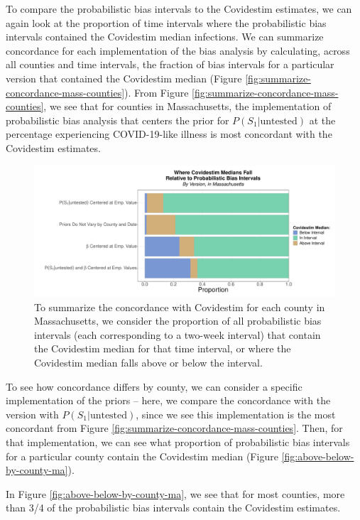 \documentclass[12pt,twoside]{smiththesis}
\begin{document}
To compare the probabilistic bias intervals to the Covidestim estimates, we can again look at the proportion of time intervals where the probabilistic bias intervals contained the Covidestim median infections. We can summarize concordance for each implementation of the bias analysis by calculating, across all counties and time intervals, the fraction of bias intervals for a particular version that contained the Covidestim median (Figure \ref{fig:summarize-concordance-mass-counties}). From Figure \ref{fig:summarize-concordance-mass-counties}, we see that for counties in Massachusetts, the implementation of probabilistic bias analysis that centers the prior for \(P(S_1|\text{untested})\) at the percentage experiencing COVID-19-like illness is most concordant with the Covidestim estimates.
\begin{figure}
\includegraphics[width=1\linewidth]{figure/summarize-concordance-mass-counties} \caption{\label{fig:summarize-concordance-mass-counties} To summarize the concordance with Covidestim for each county in Massachusetts, we consider the proportion of all probabilistic bias intervals (each corresponding to a two-week interval) that contain the Covidestim median for that time interval, or where the Covidestim median falls above or below the interval.}\label{fig:unnamed-chunk-78}
\end{figure}
To see how concordance differs by county, we can consider a specific implementation of the priors -- here, we compare the concordance with the version with \(P(S_1|\text{untested})\), since we see this implementation is the most concordant from Figure \ref{fig:summarize-concordance-mass-counties}. Then, for that implementation, we can see what proportion of probabilistic bias intervals for a particular county contain the Covidestim median (Figure \ref{fig:above-below-by-county-ma}).

In Figure \ref{fig:above-below-by-county-ma}, we see that for most counties, more than 3/4 of the probabilistic bias intervals contain the Covidestim estimates.
\end{document}
